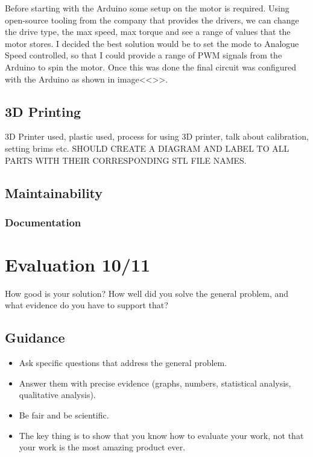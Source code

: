 \documentclass{l4proj}
\begin{document}
Before starting with the Arduino some setup on the motor is required. Using open-source tooling from the company that provides the drivers, we can change the drive type, the max speed, max torque and see a range of values that the motor stores. I decided the best solution would be to set the mode to Analogue Speed controlled, so that I could provide a range of PWM signals from the Arduino to spin the motor. Once this was done the final circuit was configured with the Arduino as shown in image<<>>.


\section{3D Printing}
3D Printer used, plastic used, process for using 3D printer, talk about calibration, setting brims etc.
SHOULD CREATE A DIAGRAM AND LABEL TO ALL PARTS WITH THEIR CORRESPONDING STL FILE NAMES.

\section{Maintainability}
\subsection{Documentation}






\chapter{Evaluation 10/11} 
How good is your solution? How well did you solve the general problem, and what evidence do you have to support that?

\section{Guidance}
\begin{itemize}
  \item
    Ask specific questions that address the general problem.
  \item
    Answer them with precise evidence (graphs, numbers, statistical
    analysis, qualitative analysis).
  \item
    Be fair and be scientific.
  \item
    The key thing is to show that you know how to evaluate your work, not
    that your work is the most amazing product ever.
\end{itemize}
\end{document}
